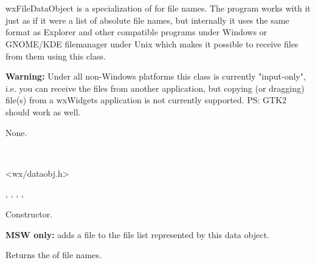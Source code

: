 \section{}\label{wxfiledataobject}

wxFileDataObject is a specialization of  
for file names. The program works with it just as if it were a list of absolute file
names, but internally it uses the same format as
Explorer and other compatible programs under Windows or GNOME/KDE filemanager
under Unix which makes it possible to receive files from them using this
class.

{\bf Warning:} Under all non-Windows platforms this class is currently
"input-only", i.e. you can receive the files from another application, but
copying (or dragging) file(s) from a wxWidgets application is not currently
supported. PS: GTK2 should work as well.


None.


\\


<wx/dataobj.h>


, 
, 
, 
, 


\label{wxfiledataobjectwxfiledataobject}


Constructor.

\label{wxfiledataobjectaddfile}


{\bf MSW only:} adds a file to the file list represented by this data object.

\label{wxfiledataobjectgetfilenames}


Returns the  of file names.

